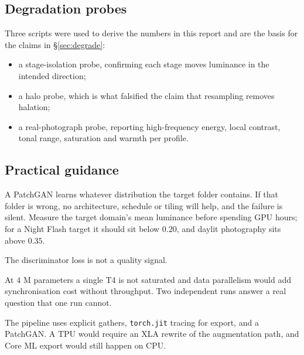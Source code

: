 \documentclass[11pt,a4paper]{article}
\newcommand{\code}[1]{\texttt{#1}}
\begin{document}
\subsection{Degradation probes}

Three scripts were used to derive the numbers in this report and are the basis
for the claims in \S\ref{sec:degrade}:

\begin{itemize}[leftmargin=1.4em]
  \item a stage-isolation probe, confirming each stage moves luminance in the
        intended direction;
  \item a halo probe, which is what falsified the claim that resampling removes
        halation;
  \item a real-photograph probe, reporting high-frequency energy, local contrast,
        tonal range, saturation and warmth per profile.
\end{itemize}

\subsection{Practical guidance}

\begin{description}[leftmargin=1.4em,style=nextline]
  \item[Target domain first.] A PatchGAN learns whatever distribution the target
        folder contains. If that folder is wrong, no architecture, schedule or
        tiling will help, and the failure is silent. Measure the target domain's
        mean luminance before spending GPU hours; for a Night Flash target it
        should sit below $0.20$, and daylit photography sits above $0.35$.
  \item[Watch the strip, not the loss.] The discriminator loss is not a quality
        signal.
  \item[Two arms, two GPUs.] At $4$ M parameters a single T4 is not saturated
        and data parallelism would add synchronisation cost without throughput.
        Two independent runs answer a real question that one run cannot.
  \item[No TPU.] The pipeline uses explicit gathers, \code{torch.jit} tracing for
        export, and a PatchGAN. A TPU would require an XLA rewrite of the
        augmentation path, and Core ML export would still happen on CPU.
\end{description}
\end{document}
